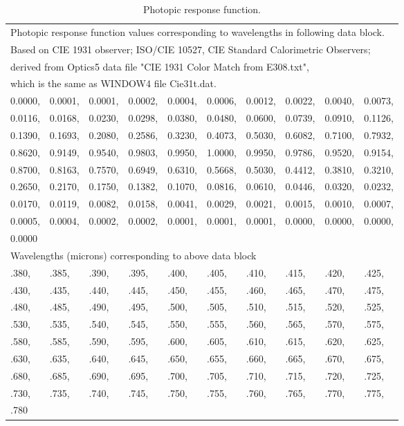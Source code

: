 \begin{longtable}[c]{p{0.5in}p{0.5in}p{0.5in}p{0.5in}p{0.5in}p{0.5in}p{0.5in}p{0.5in}p{0.5in}p{0.5in}}
\caption{Photopic response function. \label{table:photopic-response-function.}}\\
\toprule 
\multicolumn{10}{l}{Photopic response function values corresponding to wavelengths in following data block.} \tabularnewline 
\multicolumn{10}{l}{Based on CIE 1931 observer; ISO/CIE 10527, CIE Standard Calorimetric Observers;} \tabularnewline 
\multicolumn{10}{l}{derived from Optics5 data file "CIE 1931 Color Match from E308.txt",} \tabularnewline 
\multicolumn{10}{l}{which is the same as WINDOW4 file Cie31t.dat.} \tabularnewline \midrule \endhead
0.0000, & 0.0001, & 0.0001, & 0.0002, & 0.0004, & 0.0006, & 0.0012, & 0.0022, & 0.0040, & 0.0073, \tabularnewline 
0.0116, & 0.0168, & 0.0230, & 0.0298, & 0.0380, & 0.0480, & 0.0600, & 0.0739, & 0.0910, & 0.1126, \tabularnewline 
0.1390, & 0.1693, & 0.2080, & 0.2586, & 0.3230, & 0.4073, & 0.5030, & 0.6082, & 0.7100, & 0.7932, \tabularnewline 
0.8620, & 0.9149, & 0.9540, & 0.9803, & 0.9950, & 1.0000, & 0.9950, & 0.9786, & 0.9520, & 0.9154, \tabularnewline 
0.8700, & 0.8163, & 0.7570, & 0.6949, & 0.6310, & 0.5668, & 0.5030, & 0.4412, & 0.3810, & 0.3210, \tabularnewline 
0.2650, & 0.2170, & 0.1750, & 0.1382, & 0.1070, & 0.0816, & 0.0610, & 0.0446, & 0.0320, & 0.0232, \tabularnewline 
0.0170, & 0.0119, & 0.0082, & 0.0158, & 0.0041, & 0.0029, & 0.0021, & 0.0015, & 0.0010, & 0.0007, \tabularnewline 
0.0005, & 0.0004, & 0.0002, & 0.0002, & 0.0001, & 0.0001, & 0.0001, & 0.0000, & 0.0000, & 0.0000, \tabularnewline 
0.0000 \tabularnewline \midrule
\multicolumn{10}{l}{Wavelengths (microns) corresponding to above data block} \tabularnewline \midrule
.380, & .385, & .390, & .395, & .400, & .405, & .410, & .415, & .420, & .425, \tabularnewline 
.430, & .435, & .440, & .445, & .450, & .455, & .460, & .465, & .470, & .475, \tabularnewline 
.480, & .485, & .490, & .495, & .500, & .505, & .510, & .515, & .520, & .525, \tabularnewline 
.530, & .535, & .540, & .545, & .550, & .555, & .560, & .565, & .570, & .575, \tabularnewline 
.580, & .585, & .590, & .595, & .600, & .605, & .610, & .615, & .620, & .625, \tabularnewline 
.630, & .635, & .640, & .645, & .650, & .655, & .660, & .665, & .670, & .675, \tabularnewline 
.680, & .685, & .690, & .695, & .700, & .705, & .710, & .715, & .720, & .725, \tabularnewline 
.730, & .735, & .740, & .745, & .750, & .755, & .760, & .765, & .770, & .775, \tabularnewline 
.780 \tabularnewline
\bottomrule
\end{longtable}

